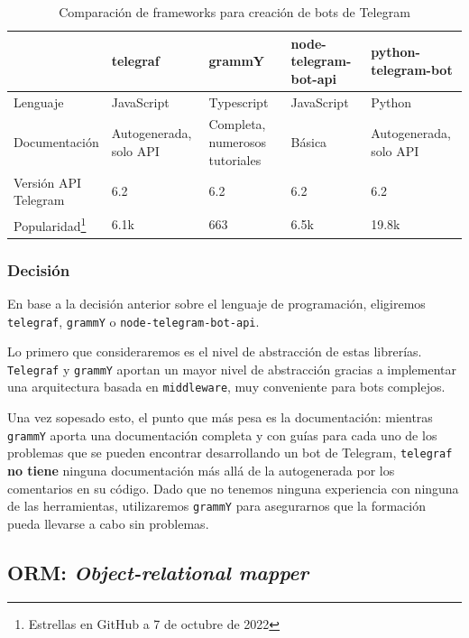 \begin{table}
\begin{minipage}{\textwidth}
\begin{tabularx}{\textwidth}{|l|X|X|X|X|}
\hline
& telegraf & grammY & node-telegram-bot-api & python-telegram-bot \\
\hline
Lenguaje & JavaScript & Typescript & JavaScript & Python \\
\hline
Documentación & Autogenerada, solo API & Completa, numerosos tutoriales & Básica & Autogenerada, solo API \\
\hline
\makecell[l]{Versión API \\Telegram} & 6.2 & 6.2 & 6.2 & 6.2 \\
\hline
Popularidad\footnote{Estrellas en GitHub a 7 de octubre de 2022} & 6.1k & 663 & 6.5k & 19.8k \\
\hline
\end{tabularx}
\end{minipage}
\caption{Comparación de frameworks para creación de bots de Telegram}\label{tab:comparacionFrameworks}
\end{table}

\subsubsection{Decisión}
En base a la decisión anterior sobre el lenguaje de programación, eligiremos \texttt{telegraf}, \texttt{grammY} o \texttt{node-telegram-bot-api}.

Lo primero que consideraremos es el nivel de abstracción de estas librerías. \texttt{Telegraf} y \texttt{grammY} aportan un mayor nivel de abstracción gracias a implementar una arquitectura basada en \texttt{middleware}, muy conveniente para bots complejos.

Una vez sopesado esto, el punto que más pesa es la documentación: mientras \texttt{grammY} aporta una documentación completa y con guías para cada uno de los problemas que se pueden encontrar desarrollando un bot de Telegram, \texttt{telegraf} \textbf{no tiene} ninguna documentación más allá de la autogenerada por los comentarios en su código. Dado que no tenemos ninguna experiencia con ninguna de las herramientas, utilizaremos \texttt{grammY} para asegurarnos que la formación pueda llevarse a cabo sin problemas.

\subsection{ORM: \textit{Object-relational mapper}}

